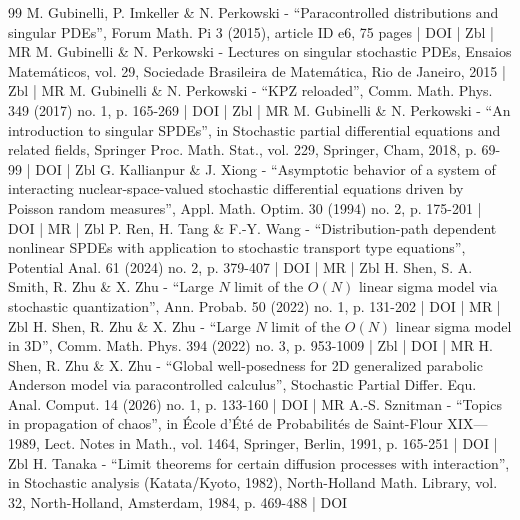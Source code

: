 \begin{thebibliography}{99}
M. Gubinelli, P. Imkeller \& N. Perkowski - “Paracontrolled distributions and singular PDEs”, Forum Math. Pi 3 (2015), article ID e6, 75 pages | DOI | Zbl | MR
M. Gubinelli \& N. Perkowski - Lectures on singular stochastic PDEs, Ensaios Matemáticos, vol. 29, Sociedade Brasileira de Matemática, Rio de Janeiro, 2015 | Zbl | MR
M. Gubinelli \& N. Perkowski - “KPZ reloaded”, Comm. Math. Phys. 349 (2017) no. 1, p. 165-269 | DOI | Zbl | MR
M. Gubinelli \& N. Perkowski - “An introduction to singular SPDEs”, in Stochastic partial differential equations and related fields, Springer Proc. Math. Stat., vol. 229, Springer, Cham, 2018, p. 69-99 | DOI | Zbl
G. Kallianpur \& J. Xiong - “Asymptotic behavior of a system of interacting nuclear-space-valued stochastic differential equations driven by Poisson random measures”, Appl. Math. Optim. 30 (1994) no. 2, p. 175-201 | DOI | MR | Zbl
P. Ren, H. Tang \& F.-Y. Wang - “Distribution-path dependent nonlinear SPDEs with application to stochastic transport type equations”, Potential Anal. 61 (2024) no. 2, p. 379-407 | DOI | MR | Zbl
H. Shen, S. A. Smith, R. Zhu \& X. Zhu - “Large $N$ limit of the $O(N)$ linear sigma model via stochastic quantization”, Ann. Probab. 50 (2022) no. 1, p. 131-202 | DOI | MR | Zbl
H. Shen, R. Zhu \& X. Zhu - “Large $N$ limit of the $O(N)$ linear sigma model in 3D”, Comm. Math. Phys. 394 (2022) no. 3, p. 953-1009 | Zbl | DOI | MR
H. Shen, R. Zhu \& X. Zhu - “Global well-posedness for 2D generalized parabolic Anderson model via paracontrolled calculus”, Stochastic Partial Differ. Equ. Anal. Comput. 14 (2026) no. 1, p. 133-160 | DOI | MR
A.-S. Sznitman - “Topics in propagation of chaos”, in École d’Été de Probabilités de Saint-Flour XIX—1989, Lect. Notes in Math., vol. 1464, Springer, Berlin, 1991, p. 165-251 | DOI | Zbl
H. Tanaka - “Limit theorems for certain diffusion processes with interaction”, in Stochastic analysis (Katata/Kyoto, 1982), North-Holland Math. Library, vol. 32, North-Holland, Amsterdam, 1984, p. 469-488 | DOI
\end{thebibliography}
